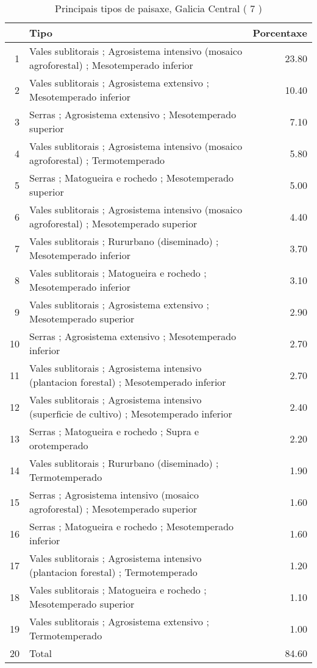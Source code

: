 \begin{table}[p]
\centering
\caption{Principais tipos de paisaxe,  Galicia Central ( 7 )} 
\label{Tipos 7}
\begin{tabular}{rlr}
  \hline
 & Tipo & Porcentaxe \\ 
  \hline
1 & Vales sublitorais ; Agrosistema intensivo (mosaico agroforestal) ; Mesotemperado inferior & 23.80 \\ 
  2 & Vales sublitorais ; Agrosistema extensivo ; Mesotemperado inferior & 10.40 \\ 
  3 & Serras ; Agrosistema extensivo ; Mesotemperado superior & 7.10 \\ 
  4 & Vales sublitorais ; Agrosistema intensivo (mosaico agroforestal) ; Termotemperado & 5.80 \\ 
  5 & Serras ; Matogueira e rochedo ; Mesotemperado superior & 5.00 \\ 
  6 & Vales sublitorais ; Agrosistema intensivo (mosaico agroforestal) ; Mesotemperado superior & 4.40 \\ 
  7 & Vales sublitorais ; Rururbano (diseminado) ; Mesotemperado inferior & 3.70 \\ 
  8 & Vales sublitorais ; Matogueira e rochedo ; Mesotemperado inferior & 3.10 \\ 
  9 & Vales sublitorais ; Agrosistema extensivo ; Mesotemperado superior & 2.90 \\ 
  10 & Serras ; Agrosistema extensivo ; Mesotemperado inferior & 2.70 \\ 
  11 & Vales sublitorais ; Agrosistema intensivo (plantacion forestal) ; Mesotemperado inferior & 2.70 \\ 
  12 & Vales sublitorais ; Agrosistema intensivo (superficie de cultivo) ; Mesotemperado inferior & 2.40 \\ 
  13 & Serras ; Matogueira e rochedo ; Supra e orotemperado & 2.20 \\ 
  14 & Vales sublitorais ; Rururbano (diseminado) ; Termotemperado & 1.90 \\ 
  15 & Serras ; Agrosistema intensivo (mosaico agroforestal) ; Mesotemperado superior & 1.60 \\ 
  16 & Serras ; Matogueira e rochedo ; Mesotemperado inferior & 1.60 \\ 
  17 & Vales sublitorais ; Agrosistema intensivo (plantacion forestal) ; Termotemperado & 1.20 \\ 
  18 & Vales sublitorais ; Matogueira e rochedo ; Mesotemperado superior & 1.10 \\ 
  19 & Vales sublitorais ; Agrosistema extensivo ; Termotemperado & 1.00 \\ 
  20 & Total & 84.60 \\ 
   \hline
\end{tabular}
\end{table}
